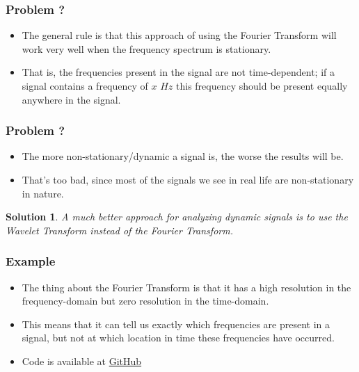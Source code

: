 \documentclass{beamer}
\newcommand{\github}{
\href{https://github.com/A-M-Kharazi/Machine-Learning-TMU}{GitHub}
}
\newtheorem{solu}{Solution}
\begin{document}
\begin{frame}
	\frametitle{Problem ? }
	
	\begin{itemize}
		\item 
			The general rule is that this approach of using the Fourier Transform will work very well when the frequency spectrum is stationary.
		
		\item
		
		That is, the frequencies present in the signal are not time-dependent; if a signal contains a frequency of $x$ $Hz$ this frequency should be present equally anywhere in the signal.
		
	\end{itemize}
	
\end{frame}


\begin{frame}
	\frametitle{Problem ?}
	
	\begin{itemize}
		\item
		The more non-stationary/dynamic a signal is, the worse the results will be.
		
		\item
		That’s too bad, since most of the signals we see in real life are non-stationary in nature.
		
	\end{itemize}


	\begin{solu}
		A much better approach for analyzing dynamic signals is to use the Wavelet Transform instead of the Fourier Transform.
	\end{solu}

\end{frame}

\begin{frame}
	\frametitle{Example}
	
	\begin{itemize}
		\item 
		The thing about the Fourier Transform is that it has a high resolution in the frequency-domain but zero resolution in the time-domain.
		
		\item
		
		This means that it can tell us exactly which frequencies are present in a signal, but not at which location in time these frequencies have occurred.
		
		\item 
		Code is available at \github
		
	\end{itemize}
	
\end{frame}
\end{document}
